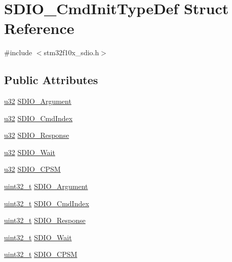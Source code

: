 \hypertarget{struct_s_d_i_o___cmd_init_type_def}{}\section{S\+D\+I\+O\+\_\+\+Cmd\+Init\+Type\+Def Struct Reference}
\label{struct_s_d_i_o___cmd_init_type_def}


{\ttfamily \#include $<$stm32f10x\+\_\+sdio.\+h$>$}

\subsection*{Public Attributes}
\begin{DoxyCompactItemize}
\item 
\hyperlink{agilefox_2library_2inc_2stm32f10x__type_8h_a2caf5cd7bcdbe1eefa727f44ffb10bac}{u32} \hyperlink{struct_s_d_i_o___cmd_init_type_def_a805f2c603cbec687f2ecf8a0f0ce582b}{S\+D\+I\+O\+\_\+\+Argument}
\item 
\hyperlink{agilefox_2library_2inc_2stm32f10x__type_8h_a2caf5cd7bcdbe1eefa727f44ffb10bac}{u32} \hyperlink{struct_s_d_i_o___cmd_init_type_def_ab4e4ff40d8295a9cf08829e552dec964}{S\+D\+I\+O\+\_\+\+Cmd\+Index}
\item 
\hyperlink{agilefox_2library_2inc_2stm32f10x__type_8h_a2caf5cd7bcdbe1eefa727f44ffb10bac}{u32} \hyperlink{struct_s_d_i_o___cmd_init_type_def_a550e0368580051feec9d7599063cdd5a}{S\+D\+I\+O\+\_\+\+Response}
\item 
\hyperlink{agilefox_2library_2inc_2stm32f10x__type_8h_a2caf5cd7bcdbe1eefa727f44ffb10bac}{u32} \hyperlink{struct_s_d_i_o___cmd_init_type_def_a5010f9ec3f62280b22bc6bb5b2d18111}{S\+D\+I\+O\+\_\+\+Wait}
\item 
\hyperlink{agilefox_2library_2inc_2stm32f10x__type_8h_a2caf5cd7bcdbe1eefa727f44ffb10bac}{u32} \hyperlink{struct_s_d_i_o___cmd_init_type_def_a154cbf69d4b6538b10a8de4b6422b9ce}{S\+D\+I\+O\+\_\+\+C\+P\+SM}
\item 
\hyperlink{_p_e___types_8h_a33594304e786b158f3fb30289278f5af}{uint32\+\_\+t} \hyperlink{struct_s_d_i_o___cmd_init_type_def_a37dfc4d7191ec10cffdb05ecf58d4807}{S\+D\+I\+O\+\_\+\+Argument}
\item 
\hyperlink{_p_e___types_8h_a33594304e786b158f3fb30289278f5af}{uint32\+\_\+t} \hyperlink{struct_s_d_i_o___cmd_init_type_def_ab5e1df1f0e8d48a308edfb59a6f80fb4}{S\+D\+I\+O\+\_\+\+Cmd\+Index}
\item 
\hyperlink{_p_e___types_8h_a33594304e786b158f3fb30289278f5af}{uint32\+\_\+t} \hyperlink{struct_s_d_i_o___cmd_init_type_def_aecb203e21321126d5f05c34787cacfd2}{S\+D\+I\+O\+\_\+\+Response}
\item 
\hyperlink{_p_e___types_8h_a33594304e786b158f3fb30289278f5af}{uint32\+\_\+t} \hyperlink{struct_s_d_i_o___cmd_init_type_def_a582258554233ff8550bd04d2d790c67c}{S\+D\+I\+O\+\_\+\+Wait}
\item 
\hyperlink{_p_e___types_8h_a33594304e786b158f3fb30289278f5af}{uint32\+\_\+t} \hyperlink{struct_s_d_i_o___cmd_init_type_def_ab0e869ae285cc132478dd743c28cd8e2}{S\+D\+I\+O\+\_\+\+C\+P\+SM}
\end{DoxyCompactItemize}


